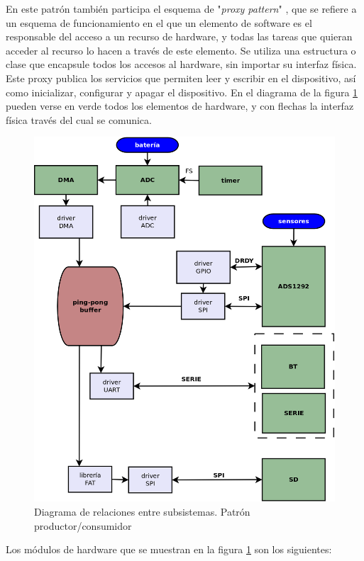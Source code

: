 En este patrón también participa el esquema de "\textit{proxy pattern}" \citep{douglass2011}, que se refiere a un esquema de funcionamiento en el que un elemento de software es el responsable del acceso a un recurso de hardware, y todas las tareas que quieran acceder al recurso lo hacen a través de este elemento. Se utiliza una estructura o clase que encapsule todos los accesos al hardware, sin importar su interfaz física. Este proxy publica los servicios que permiten leer y escribir en el dispositivo, así como inicializar, configurar y apagar el dispositivo. En el diagrama de la figura \ref{fig:patronProdCons} pueden verse en verde todos los elementos de hardware, y con flechas la interfaz física través del cual se comunica. 

\begin{figure}[!htbp]
	\centering
	\includegraphics[width=\textwidth]{./Figures/patronProdCons.png}
	\caption{Diagrama de relaciones entre subsistemas. Patrón productor/consumidor}
	\label{fig:patronProdCons}
\end{figure}

Los módulos de hardware que se muestran en la figura \ref{fig:patronProdCons} son los siguientes:

